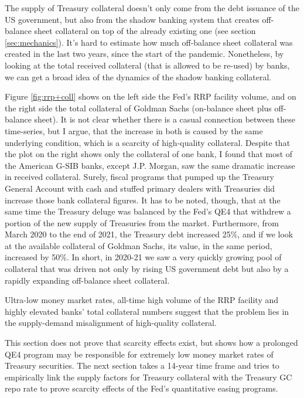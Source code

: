 \documentclass[11pt,a4paper,english,oneside]{article}
\begin{document}
The supply of Treasury collateral doesn't only come from the debt issuance of the US government, but also from the shadow banking system that creates off-balance sheet collateral on top of the already existing one (see section \ref{sec:mechanics}). It's hard to estimate how much off-balance sheet collateral was created in the last two years, since the start of the pandemic. Nonetheless, by looking at the total received collateral (that is allowed to be re-used) by banks, we can get a broad idea of the dynamics of the shadow banking collateral.

Figure \ref{fig:rrp+coll} shows on the left side the Fed's RRP facility volume, and on the right side the total collateral of Goldman Sachs (on-balance sheet plus off-balance sheet). It is not clear whether there is a casual connection between these time-series, but I argue, that the increase in both is caused by the same underlying condition, which is a scarcity of high-quality collateral. Despite that the plot on the right shows only the collateral of one bank, I found that most of the American G-SIB  banks, except J.P. Morgan, saw the same dramatic increase in received collateral. Surely, fiscal programs that pumped up the Treasury General Account with cash and stuffed primary dealers with Treasuries did increase those bank collateral figures. It has to be noted, though, that at the same time the Treasury deluge was balanced by the Fed's QE4 that withdrew a portion of the new supply of Treasuries from the market. Furthermore, from March 2020 to the end of 2021, the Treasury debt increased 25\%, and if we look at the available collateral of Goldman Sachs, its value, in the same period, increased by 50\%. In short, in 2020-21 we saw a very quickly growing pool of collateral that was driven not only by rising US government debt but also by a rapidly expanding off-balance sheet collateral.

Ultra-low money market rates, all-time high volume of the RRP facility and highly elevated banks' total collateral numbers suggest that the problem lies in the supply-demand misalignment of high-quality collateral.

This section does not prove that scarcity effects exist, but shows how a prolonged QE4 program may be responsible for extremely low money market rates of Treasury securities. The next section takes a 14-year time frame and tries to empirically link the supply factors for Treasury collateral with the Treasury GC repo rate to prove scarcity effects of the Fed's quantitative easing programs.
\end{document}
